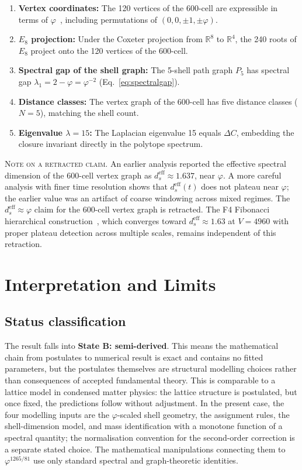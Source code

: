 \documentclass[12pt]{article}
\newcommand{\phig}{\varphi}
\newcommand{\dseff}{d_s^{\mathrm{eff}}}
\begin{document}
\begin{enumerate}
    \item \textbf{Vertex coordinates:} The 120 vertices of the 600-cell are expressible in terms of $\phig$~\citep{Coxeter1973}, including permutations of $(0, 0, \pm 1, \pm \phig)$.
    \item \textbf{$E_8$ projection:} Under the Coxeter projection from $\mathbb{R}^8$ to $\mathbb{R}^4$, the 240 roots of $E_8$ project onto the 120 vertices of the 600-cell.
    \item \textbf{Spectral gap of the shell graph:} The 5-shell path graph $P_5$ has spectral gap $\lambda_1 = 2 - \phig = \phig^{-2}$ (Eq.~\eqref{eq:spectralgap}).
    \item \textbf{Distance classes:} The vertex graph of the 600-cell has five distance classes ($N = 5$), matching the shell count.
    \item \textbf{Eigenvalue $\lambda = 15$:} The Laplacian eigenvalue 15 equals $\Delta C$, embedding the closure invariant directly in the polytope spectrum.
\end{enumerate}

\textsc{Note on a retracted claim.} An earlier analysis reported the effective spectral dimension of the 600-cell vertex graph as $\dseff \approx 1.637$, near $\phig$. A more careful analysis with finer time resolution shows that $\dseff(t)$ does not plateau near $\phig$; the earlier value was an artifact of coarse windowing across mixed regimes. The $\dseff \approx \phig$ claim for the 600-cell vertex graph is retracted. The F4 Fibonacci hierarchical construction~\citep{SmartIII}, which converges toward $\dseff \approx 1.63$ at $V = 4960$ with proper plateau detection across multiple scales, remains independent of this retraction.

\section{Interpretation and Limits}\label{sec:limits}

\subsection{Status classification}

The result falls into \textbf{State B: semi-derived}. This means the mathematical chain from postulates to numerical result is exact and contains no fitted parameters, but the postulates themselves are structural modelling choices rather than consequences of accepted fundamental theory. This is comparable to a lattice model in condensed matter physics: the lattice structure is postulated, but once fixed, the predictions follow without adjustment. In the present case, the four modelling inputs are the $\phig$-scaled shell geometry, the assignment rules, the shell-dimension model, and mass identification with a monotone function of a spectral quantity; the normalisation convention for the second-order correction is a separate stated choice. The mathematical manipulations connecting them to $\phig^{1265/81}$ use only standard spectral and graph-theoretic identities.
\end{document}
